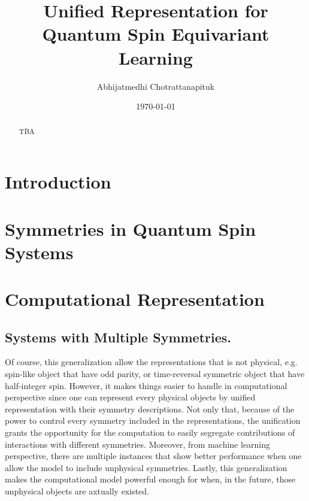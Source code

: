 \documentclass[preprint, 12pt]{revtex4-2}
\numberwithin{equation}{section}
\begin{document}
\title{Unified Representation for Quantum Spin Equivariant Learning}

\author{Abhijatmedhi Chotrattanapituk}

\date{\today}

\begin{abstract}
    TBA
\end{abstract}

\maketitle
\newpage

\section{Introduction}

\section{Symmetries in Quantum Spin Systems}

\section{Computational Representation}

\subsection{Systems with Multiple Symmetries.}
Of course, this generalization allow the representations that is not physical, e.g. spin-like object that have odd parity, or time-reversal symmetric object that have half-integer spin. However, it makes things easier to handle in computational perspective since one can represent every physical objects by unified representation with their symmetry descriptions. Not only that, because of the power to control every symmetry included in the representations, the unification grants the opportunity for the computation to easily segregate contributions of interactions with different symmetries. Moreover, from machine learning perspective, there are multiple instances that show better performance when one allow the model to include unphysical symmetries. Lastly, this generalization makes the computational model powerful enough for when, in the future, those unphysical objects are axtually existed.
\end{document}
